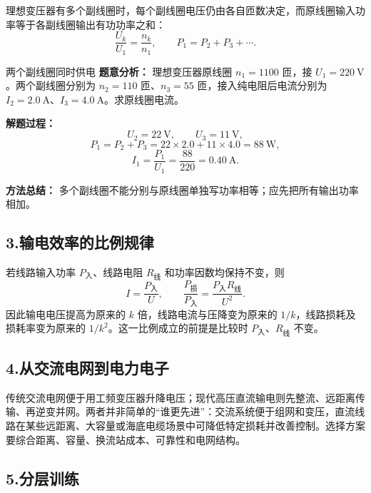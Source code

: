 理想变压器有多个副线圈时，每个副线圈电压仍由各自匝数决定，而原线圈输入功率等于各副线圈输出有功功率之和：
\[
\frac{U_k}{U_1}=\frac{n_k}{n_1},\qquad
P_1=P_2+P_3+\cdots.
\]

\begin{center}


\label{fig:transformer-multiple-loads}
\end{center}

\begin{examplebox}{两个副线圈同时供电}
\textbf{题意分析：} 理想变压器原线圈 $n_1=1100$ 匝，接 $U_1=220\ \mathrm V$。两个副线圈分别为 $n_2=110$ 匝、$n_3=55$ 匝，接入纯电阻后电流分别为 $I_2=2.0\ \mathrm A$、$I_3=4.0\ \mathrm A$。求原线圈电流。

\textbf{解题过程：}
\[
U_2=22\ \mathrm V,\qquad U_3=11\ \mathrm V,
\]
\[
P_1=P_2+P_3=22\times2.0+11\times4.0=88\ \mathrm W,
\]
\[
\boxed{I_1=\frac{P_1}{U_1}=\frac{88}{220}=0.40\ \mathrm A}.
\]

\textbf{方法总结：} 多个副线圈不能分别与原线圈单独写功率相等；应先把所有输出功率相加。
\end{examplebox}

\subsection*{3.\quad 输电效率的比例规律}

若线路输入功率 $P_{\text{入}}$、线路电阻 $R_{\text{线}}$ 和功率因数均保持不变，则
\[
I=\frac{P_{\text{入}}}{U},\qquad
\frac{P_{\text{损}}}{P_{\text{入}}}
=\frac{P_{\text{入}}R_{\text{线}}}{U^2}.
\]
因此输电电压提高为原来的 $k$ 倍，线路电流与压降变为原来的 $1/k$，线路损耗及损耗率变为原来的 $1/k^2$。这一比例成立的前提是比较时 $P_{\text{入}}$、$R_{\text{线}}$ 不变。

\subsection*{4.\quad 从交流电网到电力电子}

传统交流电网便于用工频变压器升降电压；现代高压直流输电则先整流、远距离传输、再逆变并网。两者并非简单的“谁更先进”：交流系统便于组网和变压，直流线路在某些远距离、大容量或海底电缆场景中可降低特定损耗并改善控制。选择方案要综合距离、容量、换流站成本、可靠性和电网结构。

\subsection*{5.\quad 分层训练}

